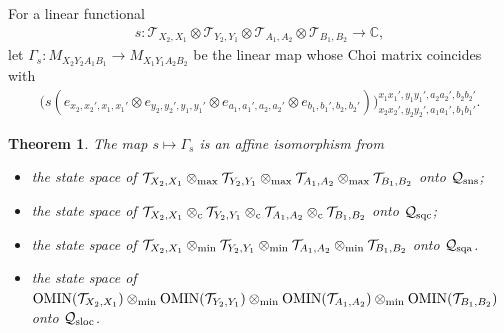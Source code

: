 \documentclass[11pt]{amsart}
\newtheorem{theorem}{Theorem}[section]
\newcommand{\cl}[1]{\mathcal{#1}}
\newcommand{\bb}[1]{\mathbb{#1}}
\begin{document}
For a linear functional
\begin{gather*}
	s: \cl{T}_{X_{2}, X_{1}}\otimes \cl{T}_{Y_{2}, Y_{1}}\otimes \cl{T}_{A_{1}, A_{2}}\otimes \cl{T}_{B_{1}, B_{2}}\rightarrow \bb{C}, 
\end{gather*}
\noindent let $\Gamma_{s}: M_{X_{2}Y_{2}A_{1}B_{1}}\rightarrow M_{X_{1}Y_{1}A_{2}B_{2}}$ be the linear map whose Choi matrix coincides with
\begin{gather}\label{choi_matrix_formula}
	\big(s(e_{x_{2}, x_{2}', x_{1}, x_{1}'}\otimes e_{y_{2}, y_{2}', y_{1}, y_{1}'}\otimes e_{a_{1}, a_{1}', a_{2}, a_{2}'}\otimes e_{b_{1}, b_{1}', b_{2}, b_{2}'})\big)_{x_{2}x_{2}', y_{2}y_{2}', a_{1}a_{1}', b_{1}b_{1}'}^{x_{1}x_{1}', y_{1}y_{1}', a_{2}a_{2}', b_{2}b_{2}'}.
\end{gather}
\begin{theorem}\label{state_correspondence}
The map $s \mapsto \Gamma_{s}$ is an affine isomorphism from 
\begin{itemize}
	\item[(i)] the state space of $\cl{T}_{X_{2}, X_{1}}\otimes_{\rm max} \cl{T}_{Y_{2}, Y_{1}}\otimes_{\rm max} \cl{T}_{A_{1}, A_{2}}\otimes_{\rm max} \cl{T}_{B_{1}, B_{2}}$ onto $\cl{Q}_{\rm sns}$;
	\item[(ii)] the state space of $\cl{T}_{X_{2}, X_{1}}\otimes_{\rm c} \cl{T}_{Y_{2}, Y_{1}}\otimes_{\rm c} \cl{T}_{A_{1}, A_{2}}\otimes_{\rm c} \cl{T}_{B_{1}, B_{2}}$ onto $\cl{Q}_{\rm sqc}$;
	\item[(iii)] the state space of $\cl{T}_{X_{2}, X_{1}}\otimes_{\rm min} \cl{T}_{Y_{2}, Y_{1}}\otimes_{\rm min} \cl{T}_{A_{1}, A_{2}}\otimes_{\rm min} \cl{T}_{B_{1}, B_{2}}$ onto $\cl{Q}_{\rm sqa}$.
	\item[(iv)] the state space of ${\rm OMIN}(\cl{T}_{X_{2}, X_{1}})\otimes_{\rm min} {\rm OMIN}(\cl{T}_{Y_{2}, Y_{1}})\otimes_{\rm min} {\rm OMIN}(\cl{T}_{A_{1}, A_{2}})\otimes_{\rm min} {\rm OMIN}(\cl{T}_{B_{1}, B_{2}})$ onto $\cl{Q}_{\rm sloc}$. 
\end{itemize}
\end{theorem}
\end{document}

